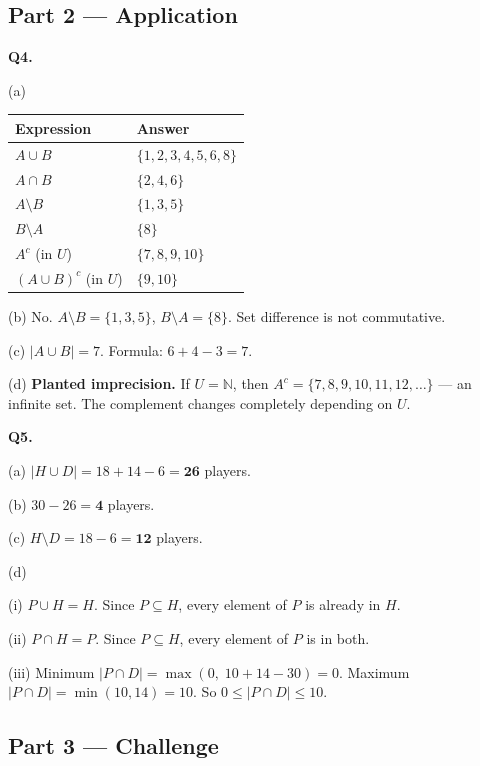 \documentclass[12pt]{article}
\begin{document}
\subsection*{Part 2 --- Application}

\bigskip
\textbf{Q4.}

(a)
\medskip
\renewcommand{\arraystretch}{1.6}
\begin{tabular}{@{} p{4cm} p{10cm} @{}}
\toprule
Expression & Answer \\
\midrule
$A \cup B$          & $\{1,2,3,4,5,6,8\}$ \\
$A \cap B$          & $\{2,4,6\}$ \\
$A \setminus B$     & $\{1,3,5\}$ \\
$B \setminus A$     & $\{8\}$ \\
$A^c$ (in $U$)      & $\{7,8,9,10\}$ \\
$(A \cup B)^c$ (in $U$) & $\{9,10\}$ \\
\bottomrule
\end{tabular}
\renewcommand{\arraystretch}{1}

(b)\; No. $A \setminus B = \{1,3,5\}$, $B \setminus A = \{8\}$. Set difference is not commutative.

(c)\; $|A \cup B| = 7$. Formula: $6 + 4 - 3 = 7$. \checkmark

(d)\; \textbf{Planted imprecision.}
If $U = \mathbb{N}$, then $A^c = \{7,8,9,10,11,12,\ldots\}$ --- an infinite set.
The complement changes completely depending on $U$.

\bigskip
\textbf{Q5.}

(a)\; $|H \cup D| = 18 + 14 - 6 = \mathbf{26}$ players.

(b)\; $30 - 26 = \mathbf{4}$ players.

(c)\; $H \setminus D = 18 - 6 = \mathbf{12}$ players.

(d)

(i)\; $P \cup H = H$.
Since $P \subseteq H$, every element of $P$ is already in $H$.

(ii)\; $P \cap H = P$.
Since $P \subseteq H$, every element of $P$ is in both.

(iii)\; Minimum $|P \cap D| = \max(0,\; 10+14-30) = 0$.
Maximum $|P \cap D| = \min(10,14) = 10$.
So $0 \leq |P \cap D| \leq 10$.

\subsection*{Part 3 --- Challenge}
\end{document}
